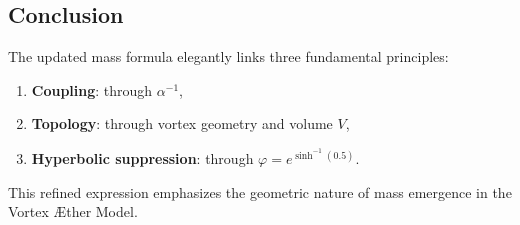 \subsection*{Conclusion}

The updated mass formula elegantly links three fundamental principles:
\begin{enumerate}
\item \textbf{Coupling}: through $\alpha^{-1}$,
\item \textbf{Topology}: through vortex geometry and volume $V$,
\item \textbf{Hyperbolic suppression}: through $\varphi = e^{\sinh^{-1}(0.5)}$.
\end{enumerate}
This refined expression emphasizes the geometric nature of mass emergence in the Vortex \AE{}ther Model.
